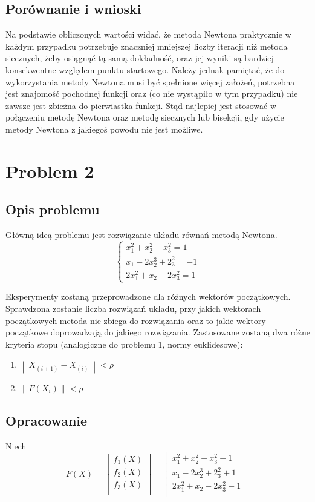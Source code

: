 \documentclass{article}
\begin{document}
\subsection{Porównanie i wnioski}

Na podstawie obliczonych wartości widać, że metoda Newtona praktycznie w każdym przypadku potrzebuje znaczniej mniejszej
liczby iteracji niż metoda siecznych, żeby osiągnąć tą samą dokładność, oraz jej wyniki są bardziej konsekwentne względem
punktu startowego. Należy jednak pamiętać, że do wykorzystania metody Newtona musi być spełnione więcej założeń, potrzebna
jest znajomość pochodnej funkcji oraz (co nie wystąpiło w tym przypadku) nie zawsze jest zbieżna do pierwiastka funkcji.
Stąd najlepiej jest stosować w połączeniu metodę Newtona oraz metodę siecznych lub bisekcji, gdy użycie metody Newtona z jakiegoś powodu
nie jest możliwe.

\section{Problem 2}
\subsection{Opis problemu}
Główną ideą problemu jest rozwiązanie układu równań metodą Newtona.
\[
\begin{cases}
    x^2_1+x^2_2-x^2_3=1 \\
    x_1-2x^3_2+2^2_3=-1 \\
    2x_1^2+x_2-2x^2_3=1
\end{cases}
\]

Eksperymenty zostaną przeprowadzone dla różnych wektorów początkowych. 
Sprawdzona zostanie liczba rozwiązań układu, przy jakich wektorach początkowych metoda 
nie zbiega do rozwiązania oraz to jakie wektory początkowe doprowadzają do jakiego 
rozwiązania. Zastosowane zostaną dwa różne kryteria stopu (analogiczne do problemu 1, normy euklidesowe):
\begin{enumerate}
    \item 
    $\left\|X_{(i+1)}-X_{(i)}\right\| < \rho$
    \item
    $\left\|F(X_i)\right\| < \rho$
\end{enumerate}

\subsection{Opracowanie}
Niech
$$F(X)=
\begin{bmatrix}
    f_1(X) \\
    f_2(X) \\
    f_3(X) \\
\end{bmatrix}
=
\begin{bmatrix}
    x^2_1+x^2_2-x^2_3 -1\\
    x_1-2x^3_2+2^2_3 +1\\
    2x_1^2+x_2-2x^2_3 -1\\
\end{bmatrix}
$$
\end{document}
